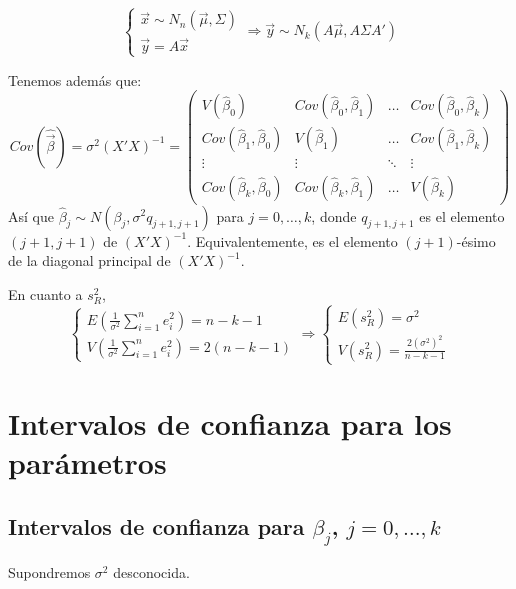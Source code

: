 \begin{note}
    $$\begin{cases}
            \vec{x} \sim N_n(\vec{\mu}, \Sigma) \\
            \vec{y} = A\vec{x}
        \end{cases} \Rightarrow \vec{y} \sim N_k(A\vec{\mu}, A\Sigma A')$$
\end{note}

Tenemos además que:
$$Cov(\hat{\vec{\beta}}) = \sigma^2(X'X)^{-1} = \begin{pmatrix}
        V(\hat{\beta}_0)                  & Cov(\hat{\beta}_0, \hat{\beta}_1) & \dots  & Cov(\hat{\beta}_0, \hat{\beta}_k) \\
        Cov(\hat{\beta}_1, \hat{\beta}_0) & V(\hat{\beta}_1)                  & \dots  & Cov(\hat{\beta}_1, \hat{\beta}_k) \\
        \vdots                            & \vdots                            & \ddots & \vdots                            \\
        Cov(\hat{\beta}_k, \hat{\beta}_0) & Cov(\hat{\beta}_k, \hat{\beta}_1) & \dots  & V(\hat{\beta}_k)
    \end{pmatrix}$$
Así que $\hat{\beta}_j \sim N(\beta_j, \sigma^2 q_{j+1, j+1})$ para $j = 0, \dots, k$, donde $q_{j+1, j+1}$ es el elemento $(j+1, j+1)$ de $(X'X)^{-1}$.
Equivalentemente, es el elemento $(j+1)$-ésimo de la diagonal principal de $(X'X)^{-1}$.

En cuanto a $s_R^2$,
$$\begin{cases}
        E(\frac{1}{\sigma^2} \sum_{i=1}^n e_i^2) = n-k-1 \\
        V(\frac{1}{\sigma^2} \sum_{i=1}^n e_i^2) = 2(n-k-1)
    \end{cases} \Rightarrow \begin{cases}
        E(s_R^2) = \sigma^2 \\
        V(s_R^2) = \frac{2(\sigma^2)^2}{n-k-1}
    \end{cases}$$

\section{Intervalos de confianza para los parámetros}
\subsection*{Intervalos de confianza para $\beta_j$, $j = 0, \dots, k$}
Supondremos $\sigma^2$ desconocida.

